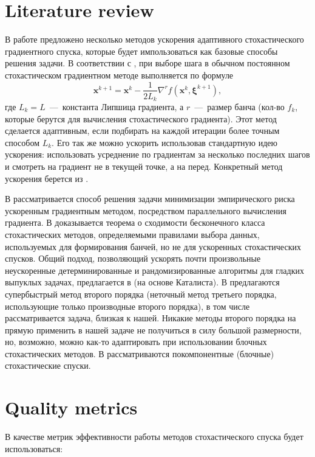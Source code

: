 \documentclass[]{scrartcl}
\begin{document}
\section{Literature review}

В работе \cite{Ogaltsov2020} предложено несколько методов ускорения адаптивного стохастического градиентного спуска, которые будет импользоваться как базовые способы решения задачи. В соответствии с \cite{Ogaltsov2020}, при выборе шага в обычном постоянном стохастическом градиентном методе выполняется по формуле
$$\boldsymbol x^{k+1}=\boldsymbol x^k-\frac{1}{2L_k}\nabla^r f(\boldsymbol x^k,\boldsymbol \xi^{k+1}),$$
где $L_k = L$~---~константа Липшица градиента, а $r$~---~размер банча (кол-во $f_k$, которые берутся для вычисления стохастического градиента). Этот метод сделается адаптивным, если подбирать на каждой итерации более точным способом $L_k$. Его так же можно ускорить использовав стандартную идею ускорения: использовать усреднение по градиентам за несколько последних шагов и смотреть на градиент не в текущей точке, а на перед. Конкретный метод ускорения берется из \cite{Ogaltsov2019}.

В \cite{Hendrikx2020} рассматривается способ решения задачи минимизации эмпирического риска ускоренным градиентным методом, посредством параллельного вычисления градиента. В \cite{Gower2019} доказывается теорема о сходимости бесконечного класса стохастических методов, определяемыми правилами выбора данных, используемых для формирования банчей, но не для ускоренных стохастических спусков. Общий подход, позволяющий ускорять почти произвольные неускоренные детерминированные и рандомизированные алгоритмы для гладких выпуклых задачах, предлагается в \cite{Ivanova2020} (на основе Каталиста). В \cite{Kamzolov2020} предлагаются супербыстрый метод второго порядка (неточный метод третьего порядка, использующие только производные второго порядка), в том числе рассматривается задача, близкая к нашей. Никакие методы второго порядка на прямую применить в нашей задаче не получиться в силу большой размерности, но, возможно, можно как-то адаптировать при использовании блочных стохастических методов. В \cite{Nesterov2010} \cite{Peter2011} \cite{Xiao2014} рассматриваются покомпонентные (блочные) стохастические спуски.

\section{Quality metrics}

В качестве метрик эффективности работы методов стохастического спуска будет использоваться: 
\end{document}
